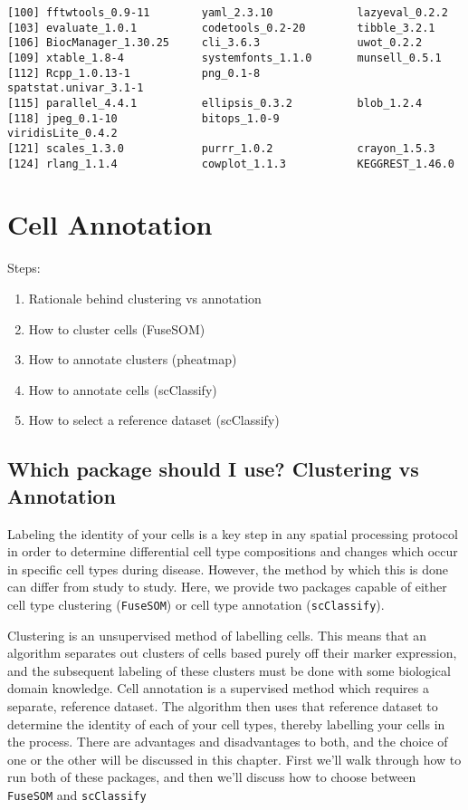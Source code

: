 \documentclass[
  letterpaper,
  DIV=11,
  numbers=noendperiod]{scrreprt}
\providecommand{\tightlist}{%
  \setlength{\itemsep}{0pt}\setlength{\parskip}{0pt}}\usepackage{longtable,booktabs,array}
\begin{document}
\begin{verbatim}
[100] fftwtools_0.9-11        yaml_2.3.10             lazyeval_0.2.2         
[103] evaluate_1.0.1          codetools_0.2-20        tibble_3.2.1           
[106] BiocManager_1.30.25     cli_3.6.3               uwot_0.2.2             
[109] xtable_1.8-4            systemfonts_1.1.0       munsell_0.5.1          
[112] Rcpp_1.0.13-1           png_0.1-8               spatstat.univar_3.1-1  
[115] parallel_4.4.1          ellipsis_0.3.2          blob_1.2.4             
[118] jpeg_0.1-10             bitops_1.0-9            viridisLite_0.4.2      
[121] scales_1.3.0            purrr_1.0.2             crayon_1.5.3           
[124] rlang_1.1.4             cowplot_1.1.3           KEGGREST_1.46.0        
\end{verbatim}


\chapter{Cell Annotation}\label{cell-annotation}

Steps:

\begin{enumerate}
\def\labelenumi{\arabic{enumi}.}
\tightlist
\item
  Rationale behind clustering vs annotation
\item
  How to cluster cells (FuseSOM)
\item
  How to annotate clusters (pheatmap)
\item
  How to annotate cells (scClassify)
\item
  How to select a reference dataset (scClassify)
\end{enumerate}

\section{Which package should I use? Clustering vs
Annotation}\label{which-package-should-i-use-clustering-vs-annotation}

Labeling the identity of your cells is a key step in any spatial
processing protocol in order to determine differential cell type
compositions and changes which occur in specific cell types during
disease. However, the method by which this is done can differ from study
to study. Here, we provide two packages capable of either cell type
clustering (\texttt{FuseSOM}) or cell type annotation
(\texttt{scClassify}).

Clustering is an unsupervised method of labelling cells. This means that
an algorithm separates out clusters of cells based purely off their
marker expression, and the subsequent labeling of these clusters must be
done with some biological domain knowledge. Cell annotation is a
supervised method which requires a separate, reference dataset. The
algorithm then uses that reference dataset to determine the identity of
each of your cell types, thereby labelling your cells in the process.
There are advantages and disadvantages to both, and the choice of one or
the other will be discussed in this chapter. First we'll walk through
how to run both of these packages, and then we'll discuss how to choose
between \texttt{FuseSOM} and \texttt{scClassify}
\end{document}
